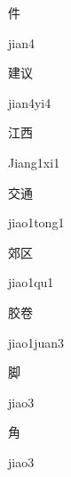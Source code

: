\begin{multicols*}{2}
\begin{verbete}[jian4]{件}
\begin{pronuncia}{jian4}
\end{pronuncia}
\end{verbete}

\begin{verbete}[jian4yi4]{建议}
\begin{pronuncia}{jian4yi4}
\end{pronuncia}
\end{verbete}

\begin{verbete}[Jiang1xi1]{江西}
\begin{pronuncia}{Jiang1xi1}
\end{pronuncia}
\end{verbete}

\begin{verbete}{交通}
\begin{pronuncia}{jiao1tong1}
\end{pronuncia}
\end{verbete}

\begin{verbete}[jiao1qu1]{郊区}
\begin{pronuncia}{jiao1qu1}
\end{pronuncia}
\end{verbete}

\begin{verbete}{胶卷}
\begin{pronuncia}{jiao1juan3}
\end{pronuncia}
\end{verbete}

\begin{verbete}[jiao3]{脚}
\begin{pronuncia}{jiao3}
\end{pronuncia}
\end{verbete}

\begin{verbete}[jiao3]{角}
\begin{pronuncia}{jiao3}
\end{pronuncia}
\end{verbete}


\end{multicols*}
